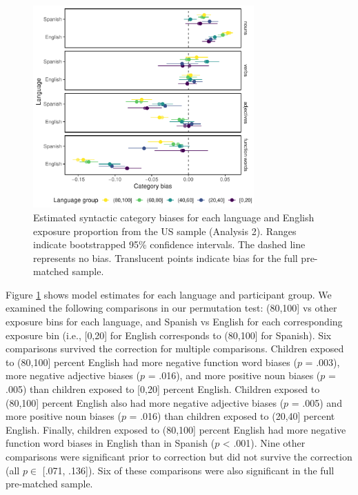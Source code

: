\documentclass[10pt, letterpaper]{article}
\begin{document}
\begin{CodeChunk}
\begin{figure}[t]

{\centering \includegraphics[width=240pt]{figs/us_bias-1} 

}

\caption[Estimated syntactic category biases for each language and English exposure proportion from the US sample (Analysis 2)]{Estimated syntactic category biases for each language and English exposure proportion from the US sample (Analysis 2). Ranges indicate bootstrapped 95\% confidence intervals. The dashed line represents no bias. Translucent points indicate bias for the full pre-matched sample.}\label{fig:us_bias}
\end{figure}
\end{CodeChunk}

Figure \ref{fig:us_bias} shows model estimates for each language and
participant group. We examined the following comparisons in our
permutation test: (80,100{]} vs other exposure bins for each language,
and Spanish vs English for each corresponding exposure bin (i.e.,
{[}0,20{]} for English corresponds to (80,100{]} for Spanish). Six
comparisons survived the correction for multiple comparisons. Children
exposed to (80,100{]} percent English had more negative function word
biases (\(p\) = .003), more negative adjective biases (\(p\) = .016),
and more positive noun biases (\(p\) = .005) than children exposed to
{[}0,20{]} percent English. Children exposed to (80,100{]} percent
English also had more negative adjective biases (\(p\) = .005) and more
positive noun biases (\(p\) = .016) than children exposed to (20,40{]}
percent English. Finally, children exposed to (80,100{]} percent English
had more negative function word biases in English than in Spanish (\(p\)
\textless{} .001). Nine other comparisons were significant prior to
correction but did not survive the correction (all \(p \in\) {[}.071,
.136{]}). Six of these comparisons were also significant in the full
pre-matched sample.
\end{document}
